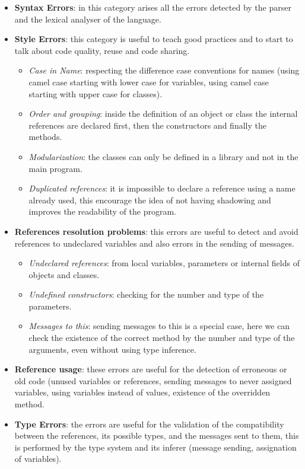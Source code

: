 \begin{itemize}
  \item \textbf{Syntax Errors}: in this category arises all the errors detected by the parser and the lexical analyser of the language.
  \item \textbf{Style Errors}: this category is useful to teach good practices and to start to talk about code quality, reuse and code sharing.
	\begin{itemize}
		\item \textit{Case in Name}: respecting the difference case conventions for names (\eg using camel case starting with lower case for variables, using camel case starting with upper case for classes).
		\item \textit{Order and grouping}: inside the definition of an object or class the internal references are declared first, then the constructors and finally the methods.
		\item \textit{Modularization}: the classes can only be defined in a library and not in the main program.		
		\item \textit{Duplicated references}: it is impossible to declare a reference using a name already used, this encourage the idea of not having shadowing and improves the readability of the program.
	\end{itemize}
  \item \textbf{References resolution problems}: this errors are useful to detect and avoid references to undeclared variables and also errors in the sending of messages.
  
	\begin{itemize}
	  \item \textit{Undeclared references}: from local variables, parameters or internal fields of objects and classes.
	  \item \textit{Undefined constructors}: checking for the number and type of the parameters.
	  \item \textit{Messages to this}: sending messages to this is a special case, here we can check the existence of the correct method by the number and type of the arguments, even without using type inference.
	\end{itemize}
	
  \item \textbf{Reference usage}: these errors are useful for the detection of erroneous or old code (\eg unused variables or references, sending messages to never assigned variables, using variables instead of values, existence of the overridden method.

  \item \textbf{Type Errors}: the errors are useful for the validation of the compatibility between the references, its possible types, and the messages sent to them, this is performed by the type system and its inferer (\eg message sending, assignation of variables).
\end{itemize}


